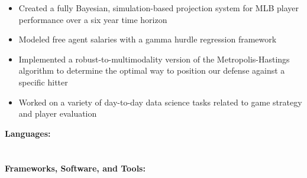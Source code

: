 \documentclass[10pt,a4paper,ragged2e,withhyper]{/Users/matt/documents/GitHub/mrkaye97.github.io/resume/altacv}
\begin{document}
\begin{paracol}{2}
		\divider

		\begin{itemize}
		\item Created a fully Bayesian, simulation-based projection system for MLB player performance over a six year time horizon
		\item Modeled free agent salaries with a gamma hurdle regression framework
		\item Implemented a robust-to-multimodality version of the Metropolis-Hastings algorithm to determine the optimal way to position our defense against a specific hitter
		\item Worked on a variety of day-to-day data science tasks related to game strategy and player evaluation
		\end{itemize}

		
%		
%		
%		
%		
		
		\switchcolumn
		\smallskip
		\textbf{Languages:}\\
		\smallskip
		\\
		
		
		\divider\smallskip\\
		\textbf{Frameworks, Software, and Tools:}\\
		\smallskip\\
		\smallskip\\
		
		 \\
		 \\
		 \\
		\\
		

\end{paracol}
\end{document}
